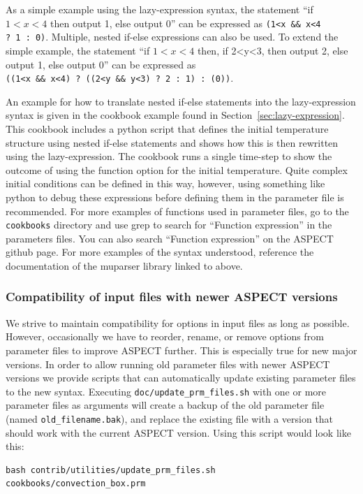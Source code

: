 \documentclass{article}
\newcommand{\aspect}{\textsc{ASPECT}}
\begin{document}
As a simple example using the lazy-expression syntax, the statement ``if $1<x<4$ then output 1, else output 0''
can be expressed as \texttt{(1<x\ \&\&\ x<4 ?\ 1\ :\ 0)}.  Multiple, nested if-else expressions
can also be used. To extend the simple example, the statement
``if $1<x<4$ then, if 2<y<3, then output 2, else output 1, else output 0''
can be expressed as \texttt{((1<x\ \&\&\ x<4)\ ?\ ((2<y\ \&\&\ y<3)\ ?\ 2\ :\ 1)\ :\ (0))}.

An example for how to translate nested if-else statements into the lazy-expression syntax is given in the
cookbook example found in Section~\ref{sec:lazy-expression}. This cookbook includes a python script that defines
the initial temperature structure using nested if-else statements and shows how this is then rewritten
using the lazy-expression. The cookbook runs a single time-step to show the outcome of using the function
option for the initial temperature. Quite complex initial conditions can be defined in this way, however,
using something like python to debug these expressions before defining them in the parameter file is
recommended. For more examples of functions used in parameter files, go to the \texttt{cookbooks}
directory and use grep to search for ``Function expression'' in the parameters files.
You can also search ``Function expression'' on the \aspect{} github page.
For more examples of the syntax understood, reference the documentation of the muparser library
linked to above.

\subsubsection{Compatibility of input files with newer \aspect{} versions}

We strive to maintain compatibility for options in input files as long as
possible. However, occasionally we have to reorder, rename, or remove options
from parameter files to improve \aspect{} further. This is especially true
for new major versions. In order to allow running old parameter files with
newer \aspect{} versions we provide scripts that can automatically update
existing parameter files to the new syntax. Executing
\texttt{doc/update\_prm\_files.sh} with one or more parameter files as
arguments will create a backup of the old parameter file (named
\texttt{old\_filename.bak}), and replace the existing file with a version that
should work with the current \aspect{} version. Using this script would look
like this:

\begin{lstlisting}[frame=single,language=ksh,showstringspaces=false]
bash contrib/utilities/update_prm_files.sh cookbooks/convection_box.prm
\end{lstlisting}
\end{document}
